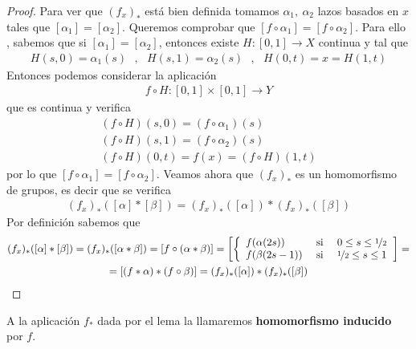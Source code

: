 \begin{lema}
    \begin{proof}
        Para ver que $(f_x)_*$ está bien definida tomamos $\alpha_1,\ \alpha_2$ lazos basados en $x$ tales que $[\alpha_1] = [\alpha_2]$. Queremos comprobar que $[f\circ \alpha_1] = [f\circ \alpha_2]$. Para ello , sabemos que si $[\alpha_1] = [\alpha_2]$, entonces existe $H:[0,1]\to X$ continua y tal que
        \begin{gather*}
            H(s,0) =\alpha_1(s)\ \ \  ,\ \ \ H(s,1) = \alpha_2(s)\ \ \ , \ \ \ H(0,t)=x=H(1,t)
        \end{gather*}
        Entonces podemos considerar la aplicación 
        \begin{align*}
            f\circ H : [0,1]\times [0,1] \to Y
        \end{align*}
        que es continua y verifica 
        \begin{gather*}
            (f\circ H) (s,0) = (f \circ \alpha_1)(s)\\
            (f\circ H) (s,1) = (f\circ \alpha_2)(s)\\
            (f\circ H) (0,t) = f(x) = (f\circ H) (1,t)
        \end{gather*}
        por lo que $[f\circ \alpha_1] = [f\circ \alpha_2]$. Veamos ahora que $(f_x)_*$ es un homomorfismo de grupos, es decir que se verifica
        \begin{gather*}
            (f_x)_* ([\alpha] \ast [\beta] ) = (f_x)_* ([\alpha]) \ast (f_x)_* ([\beta])
        \end{gather*}
        Por definición sabemos que 
        \begin{gather*}
            (f_x)_* ([\alpha] \ast [\beta] ) = (f_x)_*([\alpha \ast \beta]) = [f\circ(\alpha \ast \beta)] = \left[\left\{
                \begin{array}{l c c}
                    f(\alpha(2s)) & \text{ si } & 0\leq s \leq \nicefrac{1}{2}\\
                    f(\beta(2s-1)) & \text{ si } & \nicefrac{1}{2} \leq s \leq 1\\
                \end{array}
            \right.\right]=\\
            =[(f\ast \alpha) \ast (f\circ \beta)] = (f_x)_* ([\alpha]) \ast (f_x)_* ([\beta])
        \end{gather*}
    \end{proof}
\end{lema}

\begin{definicion}
    A la aplicación $f_*$ dada por el lema la llamaremos \textbf{homomorfismo inducido} por $f$.
\end{definicion}

